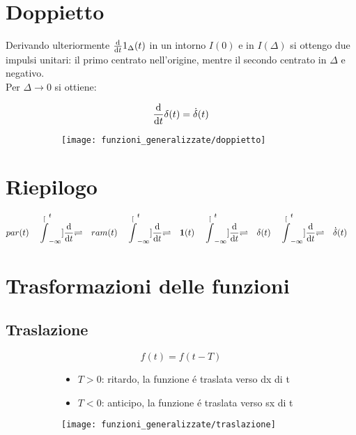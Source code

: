 \documentclass[../main.tex]{subfiles}
\begin{document}
	\section{Doppietto}
		Derivando ulteriormente $ \frac{\mathrm{d} }{\mathrm{d} t}1_{\Delta}(t) $ in un intorno $ I(0) $ e in $ I(\Delta) $ si ottengo due impulsi unitari: il primo centrato nell'origine, mentre il secondo centrato in $ \Delta $ e negativo.\\
		Per $ \Delta \longrightarrow 0 $ si ottiene:
		\begin{figure}[H]
			\centering
			\begin{subfigure}{0.5\textwidth}
				\[
					\frac{\mathrm{d} }{\mathrm{d} t} \delta(t) = \dot{\delta}(t)
				\]
			\end{subfigure}
			\begin{subfigure}{0.4\textwidth}
				\texttt{[image: funzioni\_generalizzate/doppietto]}
			\end{subfigure}
		\end{figure}
		
	\section{Riepilogo}
		\[
			par(t) \quad \stackrel[\int_{-\infty}^{t}]{\frac{\mathrm{d} }{\mathrm{d} t}}{\rightleftharpoons} 
			\quad ram(t) \quad
			\stackrel[\int_{-\infty}^{t}]{\frac{\mathrm{d} }{\mathrm{d} t}}{\rightleftharpoons}
			\quad \textbf{1}(t) \quad
			\stackrel[\int_{-\infty}^{t}]{\frac{\mathrm{d} }{\mathrm{d} t}}{\rightleftharpoons}
			\quad \delta (t) \quad
			\stackrel[\int_{-\infty}^{t}]{\frac{\mathrm{d} }{\mathrm{d} t}}{\rightleftharpoons}
			\quad \dot{\delta}(t) \quad
		\]
		
	\section{Trasformazioni delle funzioni}
	
	\subsection{Traslazione}
		\begin{figure}[H]
			\centering
			\begin{subfigure}{0.5\textwidth}
				\[
					f(t) = f(t - T)
				\]
				\begin{itemize}
					\item $ T>0 $: ritardo, la funzione \'e traslata verso dx di t
					\item $ T<0 $: anticipo, la funzione \'e traslata verso sx di t 	
				\end{itemize}
			\end{subfigure}
			\begin{subfigure}{0.4\textwidth}
				\texttt{[image: funzioni\_generalizzate/traslazione]}
			\end{subfigure}
		\end{figure}
		
\end{document}
